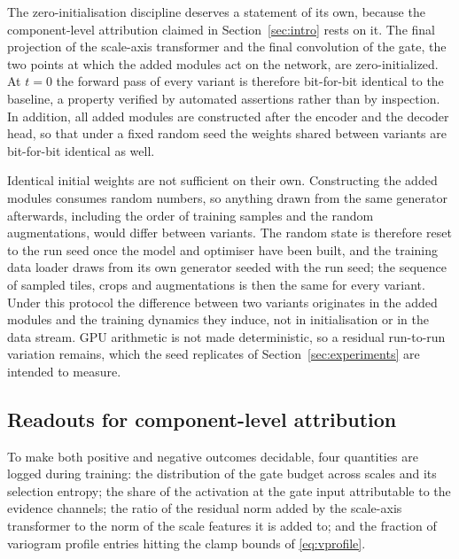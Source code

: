 \documentclass[preprint,12pt,authoryear]{elsarticle}
\begin{document}
The zero-initialisation discipline deserves a statement of its own, because the
component-level attribution claimed in Section~\ref{sec:intro} rests on it. The
final projection of the scale-axis transformer and the final convolution of the
gate, the two points at which the added modules act on the network, are
zero-initialized. At $t=0$ the forward pass of every variant is therefore
bit-for-bit identical to the baseline, a property verified by automated
assertions rather than by inspection. In addition, all added modules are
constructed after the encoder and the decoder head, so that under a fixed random
seed the weights shared between variants are bit-for-bit identical as well.

Identical initial weights are not sufficient on their own. Constructing the
added modules consumes random numbers, so anything drawn from the same
generator afterwards, including the order of training samples and the random
augmentations, would differ between variants. The random state is therefore
reset to the run seed once the model and optimiser have been built, and the
training data loader draws from its own generator seeded with the run seed; the
sequence of sampled tiles, crops and augmentations is then the same for every
variant. Under this protocol the difference between two variants originates in
the added modules and the training dynamics they induce, not in initialisation
or in the data stream. GPU arithmetic is not made deterministic, so a residual
run-to-run variation remains, which the seed replicates of
Section~\ref{sec:experiments} are intended to measure.

\subsection{Readouts for component-level attribution}
\label{sec:readouts}

To make both positive and negative outcomes decidable, four quantities are
logged during training: the distribution of the gate budget across scales and
its selection entropy; the share of the activation at the gate input
attributable to the evidence channels; the ratio of the residual norm added by
the scale-axis transformer to the norm of the scale features it is added to; and
the fraction of variogram profile entries hitting the clamp bounds of
\eqref{eq:vprofile}.
\end{document}
